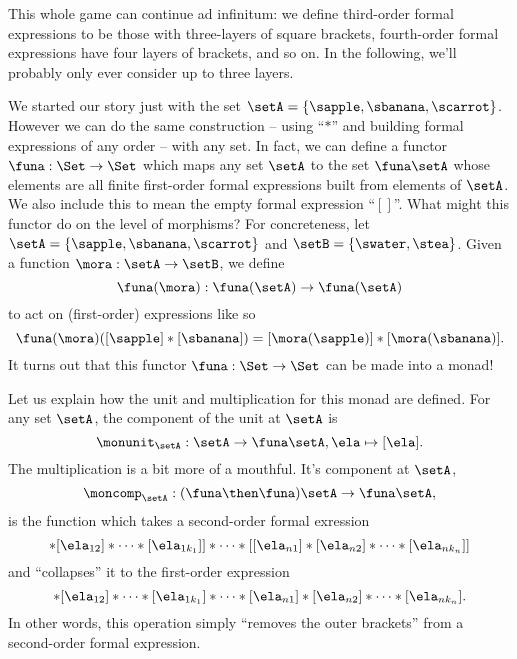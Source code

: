This whole game can continue ad infinitum: we define third-order formal expressions to be those with three-layers of square brackets, fourth-order formal expressions have four layers of brackets, and so on.
In the following, we'll probably only ever consider up to three layers.

We started our story just with the set $\setA = \{ \sapple, \sbanana, \scarrot \}$.
However we can do the same construction -- using ``$*$'' and building formal expressions of any order -- with any set.
In fact, we can define a functor $\funa: \Set \to \Set$ which maps any set $\setA$ to the set $\funa \setA$ whose elements are all finite first-order formal expressions built from elements of $\setA$.
We also include this to mean the empty formal expression ``$[ ]$''.
What might this functor do on the level of morphisms? For concreteness, let $\setA = \{ \sapple, \sbanana, \scarrot \} $ and $\setB = \{ \swater, \stea \}$.
Given a function $\mora: \setA \to \setB$, we define
\begin{equation}
    \funa(\mora) : \funa(\setA) \to \funa(\setA)
\end{equation}
to act on (first-order) expressions like so
\begin{equation}
    \funa(\mora)([\sapple]*[\sbanana]) = [\mora(\sapple)]*[\mora(\sbanana)].
\end{equation}
It turns out that this functor $\funa: \Set \to \Set$ can be made into a monad!

Let us explain how the unit and multiplication for this monad are defined.
For any set $\setA$, the component of the unit at $\setA$ is
\begin{equation}
    \monunit_\setA : \setA \to \funa \setA, \ela \mapsto [\ela].
\end{equation}
The multiplication is a bit more of a mouthful.
It's component at $\setA$,
\begin{equation}
    \moncomp_\setA : (\funa \then \funa)\setA \to \funa \setA,
\end{equation}
is the function which takes a second-order formal exression
\begin{equation}
    [[\ela_{11}]* [\ela_{12}] * \cdots * [\ela_{1k_1}]] * \cdots * [[\ela_{n1}]* [\ela_{n2}] * \cdots * [\ela_{nk_n}]]
\end{equation}
and ``collapses'' it to the first-order expression
\begin{equation}
[\ela_{11}]
    * [\ela_{12}] * \cdots * [\ela_{1k_1}] * \cdots * [\ela_{n1}]* [\ela_{n2}] * \cdots * [\ela_{nk_n}].
\end{equation}
In other words, this operation simply ``removes the outer brackets'' from a second-order formal expression.

